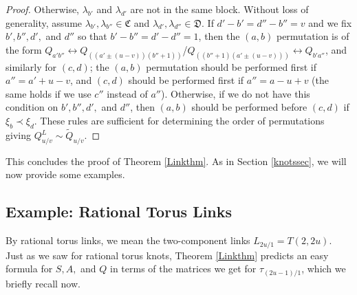 \documentclass[11pt]{amsart}
\theoremstyle{plain}
\theoremstyle{definition}
\theoremstyle{remark}
\begin{document}
\begin{proof}
    Otherwise, $\lambda_{b'}$ and $\lambda_{d'}$ are not in the same block. Without loss of generality, assume $\lambda_{b'},\lambda_{b''}\in \mathfrak{C}$ and $\lambda_{d'},\lambda_{d''}\in \mathfrak{D}$. If $d'-b'=d''-b''=v$ and we fix $b',b'',d',$ and $d''$ so that $b'-b''=d'-d''=1$, then the $(a,b)$ permutation is of the form $Q_{a'b''}\leftrightarrow Q_{((a'\pm (u-v))(b''+1))}$/$Q_{((b''+1)(a'\pm (u-v)))}\leftrightarrow Q_{b'a''}$, and similarly for $(c,d)$; the $(a,b)$ permutation should be performed first if $a''=a'+u-v$, and $(c,d)$ should be performed first if $a''=a-u+v$ (the same holds if we use $c''$ instead of $a''$). Otherwise, if we do not have this condition on $b',b'',d',$ and $d''$, then $(a,b)$ should be performed before $(c,d)$ if $\xi_b\prec\xi_d$. These rules are sufficient for determining the order of permutations giving $Q_{u/v}^L\sim \widetilde{Q}_{u/v}$.

   

\end{proof}

This concludes the proof of Theorem \ref{Linkthm}. As in Section \ref{knotssec}, we will now provide some examples.

\subsection{Example: Rational Torus Links}

By rational torus links, we mean the two-component links $L_{2u/1}=T(2,2u)$. Just as we saw for rational torus knots, Theorem \ref{Linkthm} predicts an easy formula for $S,A,$ and $Q$ in terms of the matrices we get for $\tau_{(2u-1)/1}$, which we briefly recall now.
\end{document}
